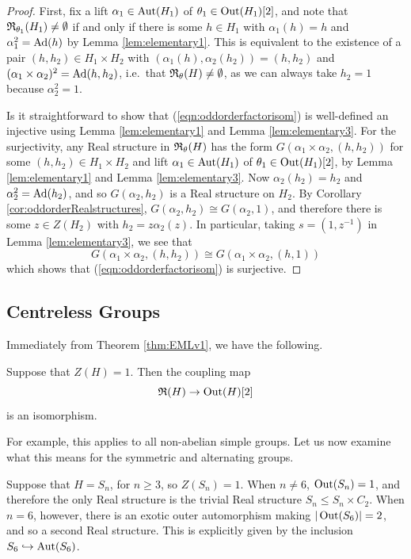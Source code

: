 \begin{proof}
  First, fix a lift $\alpha_1 \in \operatorname{Aut}(H_1)$ of $\theta_1 \in \operatorname{Out}(H_1)[2]$, and note that ${\mathfrak R}_{\theta_1}(H_1) \neq \emptyset$ if and only if there is some $h \in H_1$ with $\alpha_1(h) = h$ and $\alpha_1^2 = \operatorname{Ad}(h)$ by Lemma \ref{lem:elementary1}. This is equivalent to the existence of a pair $(h,h_2) \in H_1 \times H_2$ with $(\alpha_1(h), \alpha_2(h_2))= (h, h_2)$ and $(\alpha_1 \times \alpha_2)^2 = \operatorname{Ad}(h, h_2)$, i.e.\ that ${\mathfrak R}_{\theta}(H) \neq \emptyset$, as we can always take $h_2 = 1$ because $\alpha_2^2 = 1$.

  Is it straightforward to show that (\ref{eqn:oddorderfactorisom}) is well-defined an injective using Lemma \ref{lem:elementary1} and Lemma \ref{lem:elementary3}. For the surjectivity, any Real structure in ${\mathfrak R}_{\theta}(H)$ has the form $G(\alpha_1 \times \alpha_2, (h,h_2))$ for some $(h, h_2) \in H_1 \times H_2$ and lift $\alpha_1 \in \operatorname{Aut}(H_1)$ of $\theta_1 \in \operatorname{Out}(H_1)[2]$, by Lemma \ref{lem:elementary1} and Lemma \ref{lem:elementary3}. Now $\alpha_2(h_2) = h_2$ and $\alpha_2^2 = \operatorname{Ad}(h_2)$, and so $G(\alpha_2, h_2)$ is a Real structure on $H_2$. By Corollary \ref{cor:oddorderRealstructures}, $G(\alpha_2, h_2) \cong G(\alpha_2, 1)$, and therefore there is some $z \in Z(H_2)$ with $h_2 = z \alpha_2(z)$. In particular, taking $s = (1,z^{-1})$ in Lemma \ref{lem:elementary3}, we see that
\[
G(\alpha_1 \times \alpha_2, (h,h_2)) \cong G(\alpha_1 \times \alpha_2, (h,1))
\]
which shows that (\ref{eqn:oddorderfactorisom}) is surjective.
\end{proof}

\subsection{Centreless Groups} Immediately from Theorem \ref{thm:EMLv1}, we have the following.

\begin{cor}\label{cor:Realstructuresnocenter}
Suppose that $Z(H) = 1$. Then the coupling map
\[
    {\mathfrak R}(H) \rightarrow \operatorname{Out}(H)[2]
\]
is an isomorphism.
\end{cor}

For example, this applies to all non-abelian simple groups. Let us now examine what this means for the symmetric and alternating groups.

\begin{eg}
Suppose that $H=S_n$, for $n \geq 3$, so $Z(S_n) = 1$. When $n \neq 6$, $\operatorname{Out}(S_n) = 1$, and therefore the only Real structure is the trivial Real structure $S_n \leq S_n \times C_2$. When $n = 6$, however, there is an exotic outer automorphism making $|\operatorname{Out}(S_6)| = 2$, and so a second Real structure. This is explicitly given by the inclusion $S_6 \hookrightarrow \operatorname{Aut}(S_6)$.
\end{eg}

